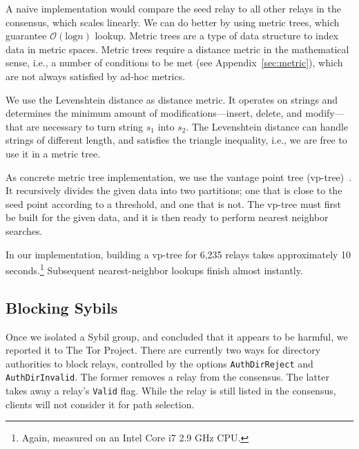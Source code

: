 A naive implementation would compare the seed relay to all other relays in the
consensus, which scales linearly.  We can do better by using metric trees, which
guarantee $\mathcal{O}(\textrm{log} n)$ lookup.  Metric trees are a type of data
structure to index data in metric spaces.  Metric trees require a distance
metric in the mathematical sense, i.e., a number of conditions to be met (see
Appendix~\ref{sec:metric}), which are not always satisfied by ad-hoc metrics.


We use the Levenshtein distance as distance metric.  It operates on strings and
determines the minimum amount of modifications---insert, delete, and
modify---that are necessary to turn string $s_{1}$ into $s_{2}$.  The
Levenshtein distance can handle strings of different length, and satisfies the
triangle inequality, i.e., we are free to use it in a metric tree.

As concrete metric tree implementation, we use the vantage point tree
(vp-tree)~\cite{Yianilos1993a}.  It recursively divides the given data into two
partitions; one that is close to the seed point according to a threshold,
and one that is not.  The vp-tree must first be built for the given data, and it
is then ready to perform nearest neighbor searches.


In our implementation, building a vp-tree for 6,235 relays takes approximately
10 seconds.\footnote{Again, measured on an Intel Core i7 2.9 GHz CPU.}
Subsequent nearest-neighbor lookups finish almost instantly.


\subsection{Blocking Sybils}
Once we isolated a Sybil group, and concluded that it appears to be harmful, we
reported it to The Tor Project.  There are currently two ways for directory
authorities to block relays, controlled by the options \texttt{AuthDirReject}
and \texttt{AuthDirInvalid}.  The former removes a relay from the consensus.
The latter takes away a relay's \texttt{Valid} flag.  While the relay is still
listed in the consensus, clients will not consider it for path selection.

